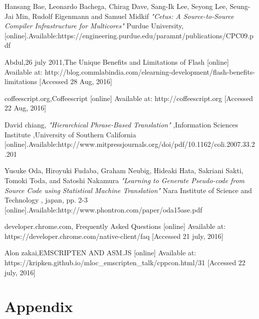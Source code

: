 \documentclass[23pt]{article}
\begin{document}
\begin{thebibliography}{9}
Hansang Bae, Leonardo Bachega, Chirag Dave, Sang-Ik Lee, Seyong Lee,
Seung-Jai Min, Rudolf Eigenmann and Samuel Midkif
\textit{"Cetus: A Source-to-Source Compiler
Infrastructure for Multicores"}
Purdue University, 
{[online].Available:https://engineering.purdue.edu/paramnt/publications/CPC09.pdf}

Abdul,26 july 2011,The Unique Benefits and Limitations of Flash  [online] Available at:
{http://blog.commlabindia.com/elearning-development/flash-benefits-limitations} [Accessed 28 Aug, 2016]

coffeescript.org,Coffeescript [online] Available at:
{http://coffeescript.org} [Accessed 22 Aug, 2016]

David chiang,
\textit{"Hierarchical Phrase-Based Translation"}
,Information Sciences Institute ,University of Southern California
{[online].Available:http://www.mitpressjournals.org/doi/pdf/10.1162/coli.2007.33.2.201}

Yusuke Oda, Hiroyuki Fudaba, Graham Neubig, Hideaki Hata,
Sakriani Sakti, Tomoki Toda, and Satoshi Nakamura
\textit{"Learning to Generate Pseudo-code from Source
Code using Statistical Machine Translation"}
Nara Institute of Science and Technology , japan,  pp. 2-3
{[online].Available:http://www.phontron.com/paper/oda15ase.pdf}

developer.chrome.com, Frequently Asked Questions  [online] Available at:
{https://developer.chrome.com/native-client/faq} [Accessed 21 july, 2016]

  Alon zakai,EMSCRIPTEN AND ASM.JS [online] Available at:
{https://kripken.github.io/mloc\_emscripten\_talk/cppcon.html/31} [Accessed 22 july, 2016]

\end{thebibliography}

\newpage

\listoffigures

\section{Appendix}
\end{document}
